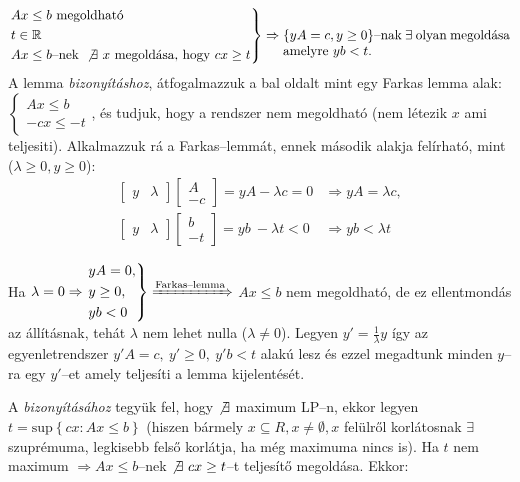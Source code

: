 \[
	\begin{rcases}
		Ax \leq b \mbox{ megoldható} \\
		t \in \mathbb{R}             \\
		Ax \leq b \mbox{--nek } \not \exists~x \mbox{ megoldása, hogy } cx \geq t
	\end{rcases} \Rightarrow
	\parbox[t]{6cm}{
$\{yA=c, y \geq 0\}$--nak $\exists$ olyan megoldása amelyre  $yb < t$.} %
\] A lemma \emph{bizonyításhoz}, átfogalmazzuk a bal oldalt mint egy Farkas
lemma alak:
$\begin{cases}Ax \leq b \\
		-cx \leq -t\end{cases}$, és tudjuk, hogy a rendszer nem megoldható (nem
létezik $x$ ami teljesiti). Alkalmazzuk rá a Farkas--lemmát, ennek második
alakja felírható, mint ($\lambda \geq 0, y
	\geq 0$):
\begin{align*}
	\begin{bmatrix} y & \lambda\end{bmatrix}
	\begin{bmatrix} A \\ -c \end{bmatrix} = yA - \lambda c = 0 & \Rightarrow
	yA = \lambda c,                                                          \\
	\begin{bmatrix} y & \lambda\end{bmatrix}
	\begin{bmatrix} b \\ -t \end{bmatrix} =yb~ - \lambda t < 0 & \Rightarrow
	yb < \lambda t
\end{align*}

Ha $\lambda=0 \Rightarrow \begin{rcases}
		yA = 0,   \\
		y \geq 0, \\
		yb <  0\end{rcases} \xRightarrow{\text{Farkas--lemma}}$ $Ax \leq b$ nem
megoldható, de ez ellentmondás az állításnak, tehát $\lambda$ nem lehet nulla
($\lambda \neq 0$). Legyen $y'=\frac{1}{\lambda}y$ így az egyenletrendszer
$y'A=c,~y'\geq0,~y'b<t$ alakú lesz és ezzel megadtunk minden $y$--ra egy
$y'$--et amely teljesíti a lemma kijelentését.

A  \emph{bizonyításához} tegyük fel, hogy $\not \exists$ maximum
LP--n, ekkor legyen $t=\mbox{sup}\left\{cx:Ax \leq b \right\}$ (hiszen bármely
$x \subseteq R, x \neq \emptyset, x$ felülről korlátosnak $\exists$ szuprémuma,
legkisebb felső korlátja, ha még maximuma nincs is). Ha $t$ nem maximum
$\Rightarrow Ax \leq b$--nek $\not \exists~cx \geq t$--t teljesítő megoldása.
Ekkor:

